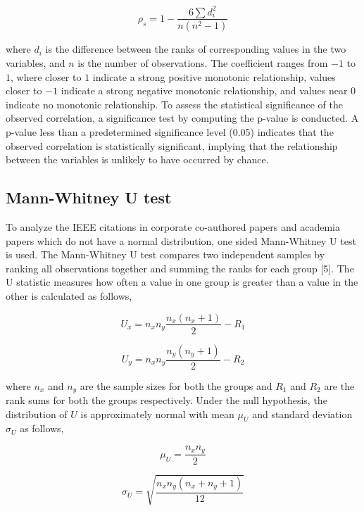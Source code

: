\documentclass{article}
\begin{document}
\begin{equation}
\rho_s = 1 - \frac{6 \sum d_i^2}{n(n^2 - 1)}
\end{equation}

where $d_i$ is the difference between the ranks of corresponding values in the two variables, and $n$ is the number of observations. The coefficient ranges from $-1$ to $1$, where closer to $1$ indicate a strong positive monotonic relationship, values closer to $-1$ indicate a strong negative monotonic relationship, and values near $0$ indicate no monotonic relationship. To assess the statistical significance of the observed correlation, a significance test by computing the p-value is conducted. A p-value less than a predetermined significance level (0.05) indicates that the observed correlation is statistically significant, implying that the relationship between the variables is unlikely to have occurred by chance.

\subsection{Mann-Whitney U test}
To analyze the IEEE citations in corporate co-authored papers and academia papers which do not have a normal distribution, one sided Mann-Whitney U test is used. The Mann-Whitney U test compares two independent samples by ranking all observations together and summing the ranks for each group [5]. The U statistic measures how often a value in one group is greater than a value in the other is calculated as follows,

\begin{equation}
U_x = n_xn_y\frac{n_x(n_x+1)}{2}-R_1
\end{equation}

\begin{equation}
    U_y = n_xn_y\frac{n_y(n_y+1)}{2}-R_2
\end{equation}

where $n_x$ and $n_y$ are the sample sizes for both the groups and $R_1$ and $R_2$ are the rank sums for both the groups respectively. Under the null hypothesis, the distribution of \( U \) is approximately normal with mean $\mu_U$ and standard deviation $\sigma_U$ as follows,

\begin{equation}
    \mu_U = \frac{n_x n_y}{2}
\end{equation}


\begin{equation}
    \sigma_U = \sqrt{\frac{n_x n_y (n_x + n_y + 1)}{12}}
\end{equation}
\end{document}

